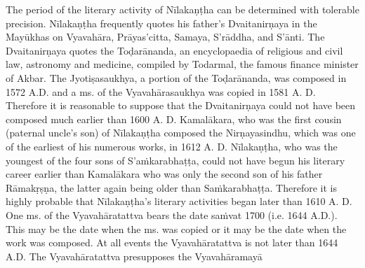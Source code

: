 \documentclass[11pt, openany]{book}
\begin{document}
The period of the literary activity of Nīlakaṇṭha can be determined with tolerable precision. Nīlakaṇṭha frequently quotes his father's Dvaitanirṇaya in the Mayūkhas on Vyavahāra, Prāyas'citta, Samaya, S'rāddha, and S'ānti. The Dvaitanirṇaya quotes the Toḍarānanda, an encyclopaedia of religious and civil law, astronomy and medicine, compiled by Todarmal, the famous finance minister of Akbar. The Jyotiṣasaukhya, a portion of the Toḍarānanda, was composed in 1572 A.D. and a ms. of the Vyavahārasaukhya was copied in 1581 A. D. Therefore it is reasonable to suppose that the Dvaitanirṇaya could not have been composed much earlier than 1600 A. D. Kamalākara, who was the first cousin (paternal uncle's son) of Nīlakaṇṭha composed the Nirṇayasindhu, which was one of the earliest of his numerous works, in 1612 A. D. Nīlakaṇṭha, who was the youngest of the four sons of S'aṁkarabhaṭṭa, could not have begun his literary career earlier than Kamalākara who was only the second son of his father Rāmakṛṣṇa, the latter again being older than Saṁkarabhaṭṭa. Therefore it is highly probable that Nīlakaṇṭha's literary activities began later than 1610 A. D. One ms. of the Vyavahāratattva bears the date saṁvat 1700 (i.e. 1644 A.D.). This may be the date when the ms. was copied or it may be the date when the work was composed. At all events the Vyavahāratattva is not later than 1644 A.D. The Vyavahāratattva presupposes the Vyavahāramayā\textendash

\newpage
\end{document}
